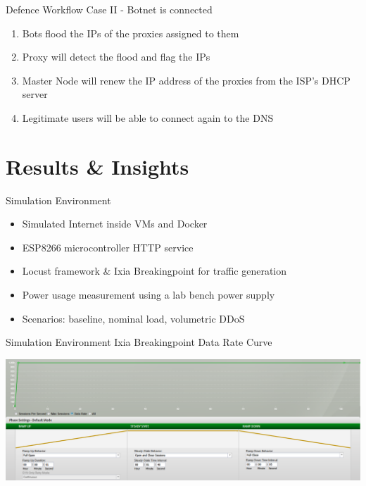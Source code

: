 \documentclass{beamer}
\begin{document}
\begin{frame}{Defence Workflow}
Case II - Botnet is connected
    \begin{enumerate}
        \item Bots flood the IPs of the proxies assigned to them
        \item Proxy will detect the flood and flag the IPs
        \item Master Node will renew the IP address of the proxies from the ISP's DHCP server
        \item Legitimate users will be able to connect again to the DNS
    \end{enumerate}

\end{frame}

\section{Results \& Insights}

\begin{frame}{Simulation Environment}
  \begin{itemize}
    \item Simulated Internet inside VMs and Docker
    \item ESP8266 microcontroller HTTP service
    \item Locust framework \& Ixia Breakingpoint for traffic generation
    \item Power usage measurement using a lab bench power supply
    \item Scenarios: baseline, nominal load, volumetric DDoS  
  \end{itemize}
\end{frame}

\begin{frame}{Simulation Environment}
    Ixia Breakingpoint Data Rate Curve
    \vspace{1em}
    \begin{center}
        \includegraphics[width=\textwidth]{images/breakingpoint_curve.png}
    \end{center}
\end{frame}
\end{document}
